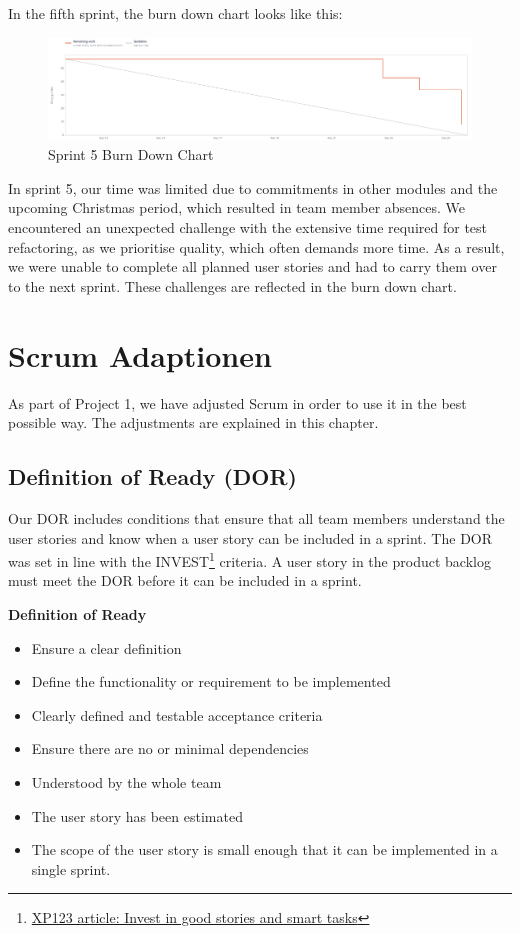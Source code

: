 In the fifth sprint, the burn down chart looks like this:
\begin{figure}[h!]
    \centering
    \includegraphics[width=1\textwidth]{pictures/Scrum/Sprint 5/Sprint5_Burndownchart}
    \caption{Sprint 5 Burn Down Chart}
    \label{fig:sprint_5_bunrdown_chart}
\end{figure}

In sprint 5, our time was limited due to commitments in other modules and the upcoming Christmas period, which resulted in team member absences.
We encountered an unexpected challenge with the extensive time required for test refactoring, as we prioritise quality, which often demands more time.
As a result, we were unable to complete all planned user stories and had to carry them over to the next sprint.
These challenges are reflected in the burn down chart.
\clearpage


\section{Scrum Adaptionen}
As part of Project 1, we have adjusted Scrum in order to use it in the best possible way. The adjustments are explained in this chapter.

\subsection{Definition of Ready (DOR)}
Our DOR includes conditions that ensure that all team members understand the user stories and know when a user story can be included in a sprint. The DOR was set in line with the INVEST\footnote{\href{https://xp123.com/articles/invest-in-good-stories-and-smart-tasks/}{XP123 article: Invest in good stories and smart tasks}} criteria. A user story in the product backlog must meet the DOR before it can be included in a sprint.

\textbf{Definition of Ready}
\begin{itemize}
    \item Ensure a clear definition
    \item Define the functionality or requirement to be implemented
    \item Clearly defined and testable acceptance criteria
    \item Ensure there are no or minimal dependencies
    \item Understood by the whole team
    \item The user story has been estimated
    \item The scope of the user story is small enough that it can be implemented in a single sprint.
\end{itemize}

